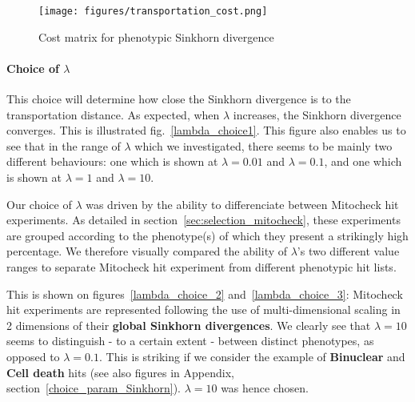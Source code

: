 
\begin{figure*}[ht!]
\centerline{\texttt{[image: figures/transportation\_cost.png]}
}
\caption{Cost matrix for phenotypic Sinkhorn divergence}
\label{cost}
\end{figure*}

\paragraph{Choice of $\lambda$} This choice will determine how close the Sinkhorn divergence is to the transportation distance. As expected, when $\lambda$ increases, the Sinkhorn divergence converges. This is illustrated fig.~\ref{lambda_choice1}. This figure also enables us to see that in the range of $\lambda$ which we investigated, there seems to be mainly two different behaviours: one which is shown at $\lambda=0.01$ and $\lambda=0.1$, and one which is shown at $\lambda=1$ and $\lambda=10$.

Our choice of $\lambda$ was driven by the ability to differenciate between Mitocheck hit experiments. As detailed in section~\ref{sec:selection_mitocheck}, these experiments are grouped according to the phenotype(s) of which they present a strikingly high percentage. We therefore visually compared the ability of $\lambda$'s two different value ranges to separate Mitocheck hit experiment from different phenotypic hit lists. 

This is shown on figures~\ref{lambda_choice_2} and~\ref{lambda_choice_3}: Mitocheck hit experiments are represented following the use of multi-dimensional scaling in 2 dimensions of their \textbf{global Sinkhorn divergences}. We clearly see that $\lambda=10$ seems to distinguish - to a certain extent - between distinct phenotypes, as opposed to $\lambda=0.1$. This is striking if we consider the example of \textbf{Binuclear} and \textbf{Cell death} hits (see also figures in Appendix, section~\ref{choice_param_Sinkhorn}). $\lambda=10$ was hence chosen.


